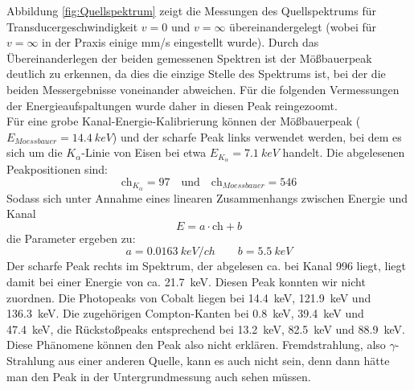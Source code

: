 \documentclass[12pt,a4paper]{article}
\begin{document}
Abbildung \ref{fig:Quellspektrum} zeigt die Messungen des Quellspektrums für Transducergeschwindigkeit $v = 0$ und $v = \infty$ übereinandergelegt (wobei für $v = \infty$ in der Praxis einige mm/s eingestellt wurde). Durch das Übereinanderlegen der beiden gemessenen Spektren ist der Mößbauerpeak deutlich zu erkennen, da dies die einzige Stelle des Spektrums ist, bei der die beiden Messergebnisse voneinander abweichen. Für die folgenden Vermessungen der Energieaufspaltungen wurde daher in diesen Peak reingezoomt.\\
Für eine grobe Kanal-Energie-Kalibrierung können der Mößbauerpeak ($E_{Moessbauer} = \SI{14,4}{keV}$) und der scharfe Peak links verwendet werden, bei dem es sich um die $K_{\alpha}$-Linie von Eisen bei etwa $E_{K_{\alpha}} = \SI{7,1}{keV}$ handelt. Die abgelesenen Peakpositionen sind:
\begin{equation*}
\textrm{ch} _{K_{\alpha}} = 97 \quad \textrm{und} \quad \textrm{ch} _{Moessbauer} = 546 
\end{equation*}
Sodass sich unter Annahme eines linearen Zusammenhangs zwischen Energie und Kanal
\begin{equation*}
E = a \cdot \textrm{ch} + b
\end{equation*}
die Parameter ergeben zu:
\begin{equation*}
a = \SI{0,0163}{keV/ch} \qquad b = \SI{5,5}{keV}
\end{equation*}
Der scharfe Peak rechts im Spektrum, der abgelesen ca. bei Kanal 996 liegt, liegt damit bei einer Energie von ca. \SI{21,7}{keV}. Diesen Peak konnten wir nicht zuordnen. Die Photopeaks von Cobalt liegen bei \SI{14,4}{keV}, \SI{121,9}{keV} und \SI{136,3}{keV}. Die zugehörigen Compton-Kanten bei \SI{0,8}{keV}, \SI{39,4}{keV} und \SI{47,4}{keV}, die Rückstoßpeaks entsprechend bei \SI{13,2}{keV}, \SI{82,5}{keV} und \SI{88,9}{keV}. Diese Phänomene können den Peak also nicht erklären. Fremdstrahlung, also $\gamma$-Strahlung aus einer anderen Quelle, kann es auch nicht sein, denn dann hätte man den Peak in der Untergrundmessung auch sehen müssen.  
\end{document}
